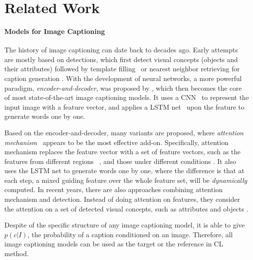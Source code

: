 
\section{Related Work}
\label{sec:relwork}


\paragraph{Models for Image Captioning}
The history of image captioning can date back to decades ago.
Early attempts are mostly based on detections,
which first detect visual concepts (\eg objects and their attributes) \cite{kulkarni2013babytalk, farhadi2010every}
followed by template filling \cite{kulkarni2013babytalk}~or nearest neighbor retrieving for caption generation \cite{devlin2015exploring, farhadi2010every}.
%
With the development of neural networks,
a more powerful paradigm, \emph{encoder-and-decoder}, was proposed by \cite{vinyals2015show},
which then becomes the core of most state-of-the-art image captioning models.
It uses a CNN \cite{simonyan2014very}~to represent the input image with a feature vector,
and applies a LSTM net~\cite{hochreiter1997long} upon the feature to generate words one by one.

Based on the encoder-and-decoder, many variants are proposed,
where \emph{attention mechanism} \cite{xu2015show}~appears to be the most effective add-on.
Specifically, attention mechanism replaces the feature vector with a set of feature vectors,
such as the features from different regions \cite{xu2015show}~, and those under different conditions \cite{zhou2016image}.
It also uses the LSTM net to generate words one by one,
where the difference is that
at each step, a mixed guiding feature over the whole feature set,
will be \emph{dynamically} computed.
%
In recent years, there are also approaches combining attention mechanism and detection.
Instead of doing attention on features,
they consider the attention on a set of detected visual concepts,
such as attributes \cite{yao2016boosting} and objects \cite{you2016image}.

Despite of the specific structure of any image captioning model,
it is able to give $p(c|I)$, the probability of a caption conditioned on an image.
Therefore, all image captioning models can be used as the target or the reference in CL method.

